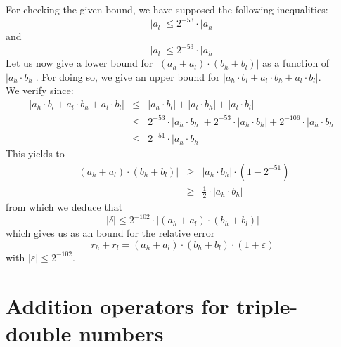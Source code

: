 \documentclass[a4paper,10pt,twoside]{article}
\newenvironment{proof}[1][Proof]{\begin{trivlist}
\item[\hskip \labelsep {\bfseries #1}]}{\end{trivlist}}
\newcommand{\qed}{\nobreak \ifvmode \relax \else \ifdim \lastskip<1.5em \hskip-\lastskip
\hskip1.5em plus0em minus0.5em \fi \nobreak \vrule height0.75em width0.5em depth0.25em\fi}
\newcommand{\hi}{\ensuremath{\mathit{h}}}
\newcommand{\lo}{\ensuremath{\mathit{l}}}
\renewcommand{\epsilon}{\varepsilon}
\begin{document}
\begin{proof}
For checking the given bound, we have supposed the following inequalities:
$$\left \vert a_\lo \right \vert \leq 2^{-53} \cdot \left \vert a_\hi \right \vert$$
and
$$\left \vert a_\lo \right \vert \leq 2^{-53} \cdot \left \vert a_\hi \right \vert$$
Let us now give a lower bound for 
$\left \vert \left( a_\hi + a_\lo \right) \cdot \left( b_\hi + b_\lo
  \right)\right \vert$ as a function of
$\left \vert a_\hi \cdot b_\hi \right \vert$. For doing so, we give an upper
bound for 
$\left \vert a_\hi \cdot b_\lo + a_\lo \cdot b_\hi + a_\lo \cdot b_\lo \right \vert$. \\
We verify since:
\begin{eqnarray*} 
\left \vert a_\hi \cdot b_\lo + a_\lo \cdot b_\hi + a_\lo \cdot b_\lo \right \vert & \leq & 
\left \vert a_\hi \cdot b_\lo \right \vert + \left \vert a_\lo \cdot b_\hi \right \vert + \left \vert a_\lo \cdot b_\lo \right \vert \\
& \leq & 2^{-53} \cdot \left \vert a_\hi \cdot b_\hi \right \vert + 2^{-53} \cdot \left \vert a_\hi \cdot b_\hi \right \vert + 
2^{-106} \cdot \left \vert a_\hi \cdot b_\hi \right \vert \\
& \leq & 2^{-51} \cdot \left \vert a_\hi \cdot b_\hi \right \vert 
\end{eqnarray*}
This yields to
\begin{eqnarray*}
\left \vert \left( a_\hi + a_\lo \right) \cdot \left( b_\hi + b_\lo \right) \right \vert & \geq &
\left \vert a_\hi \cdot b_\hi \right \vert \cdot \left(1 - 2^{-51} \right) \\
& \geq & \frac{1}{2} \cdot \left \vert a_\hi \cdot b_\hi \right \vert 
\end{eqnarray*}
from which we deduce that
$$\left \vert \delta \right \vert \leq 2^{-102} \cdot \left \vert \left( a_\hi + a_\lo \right) \cdot \left( b_\hi + b_\lo \right) \right \vert$$
which gives us as an bound for the relative error
$$r_\hi + r_\lo = \left( a_\hi + a_\lo \right) \cdot \left( b_\hi + b_\lo \right) \cdot \left(1 + \epsilon \right)$$
with
$\left \vert \epsilon \right \vert \leq 2^{-102}$. \qed
\end{proof}
\section{Addition operators for triple-double numbers}
\end{document}
